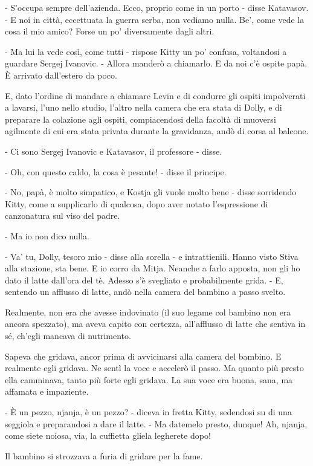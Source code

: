 - S'occupa sempre dell'azienda. Ecco, proprio come in un porto - disse Katavasov. - E noi in città, eccettuata la guerra serba, non vediamo nulla. Be', come vede la cosa il mio amico? Forse un po' diversamente dagli altri. 

- Ma lui la vede così, come tutti - rispose Kitty un po' confusa, voltandosi a guardare Sergej Ivanovic. - Allora manderò a chiamarlo. E da noi c'è ospite papà. È arrivato dall'estero da poco. 

E, dato l'ordine di mandare a chiamare Levin e di condurre gli ospiti impolverati a lavarsi, l'uno nello studio, l'altro nella camera che era stata di Dolly, e di preparare la colazione agli ospiti, compiacendosi della facoltà di muoversi agilmente di cui era stata privata durante la gravidanza, andò di corsa al balcone. 

- Ci sono Sergej Ivanovic e Katavasov, il professore - disse. 

- Oh, con questo caldo, la cosa è pesante! - disse il principe. 

- No, papà, è molto simpatico, e Kostja gli vuole molto bene - disse sorridendo Kitty, come a supplicarlo di qualcosa, dopo aver notato l'espressione di canzonatura sul viso del padre. 

- Ma io non dico nulla. 

- Va' tu, Dolly, tesoro mio - disse alla sorella - e intrattienili. Hanno visto Stiva alla stazione, sta bene. E io corro da Mitja. Neanche a farlo apposta, non gli ho dato il latte dall'ora del tè. Adesso s'è svegliato e probabilmente grida. - E, sentendo un afflusso di latte, andò nella camera del bambino a passo svelto. 

Realmente, non era che avesse indovinato (il suo legame col bambino non era ancora spezzato), ma aveva capito con certezza, all'afflusso di latte che sentiva in sé, ch'egli mancava di nutrimento. 

Sapeva che gridava, ancor prima di avvicinarsi alla camera del bambino. E realmente egli gridava. Ne sentì la voce e accelerò il passo. Ma quanto più presto ella camminava, tanto più forte egli gridava. La sua voce era buona, sana, ma affamata e impaziente. 

- È un pezzo, njanja, è un pezzo? - diceva in fretta Kitty, sedendosi su di una seggiola e preparandosi a dare il latte. - Ma datemelo presto, dunque! Ah, njanja, come siete noiosa, via, la cuffietta gliela legherete dopo! 

Il bambino si strozzava a furia di gridare per la fame. 

